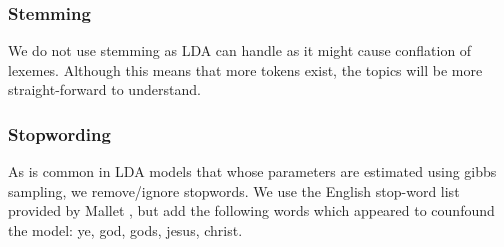 \subsubsection{Stemming}
We do not use stemming as LDA can handle as it might cause conflation of lexemes. Although this means that more tokens exist, the topics will be more straight-forward to understand.

\subsubsection{Stopwording}
As is common in LDA models that whose parameters are estimated using gibbs sampling, we remove/ignore stopwords. We use the English stop-word list provided by Mallet \cite{McCallumMALLET}, but add the following words which appeared to counfound the model: ye, god, gods, jesus, christ. %





